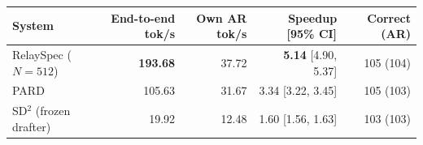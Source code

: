 \begin{tabular}{lrrrr}
\toprule
System & End-to-end tok/s & Own AR tok/s & Speedup [95\% CI] & Correct (AR) \\
\midrule
RelaySpec ($N=512$) & \textbf{193.68} & 37.72 & \textbf{5.14} [4.90, 5.37] & 105 (104) \\
PARD & 105.63 & 31.67 & 3.34 [3.22, 3.45] & 105 (103) \\
SD$^2$ (frozen drafter) & 19.92 & 12.48 & 1.60 [1.56, 1.63] & 103 (103) \\
\bottomrule
\end{tabular}
